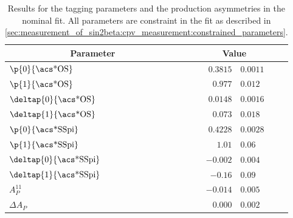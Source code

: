 \begin{table}[h]
  \caption{Results for the tagging parameters and the production asymmetries in
  the nominal fit. All parameters are constraint in the fit as described in
  \cref{sec:measurement_of_sin2beta:cpv_measurement:constrained_parameters}.}
  \label{tab:measurement_of_sin2beta:cpv_measurement:results:tagging}
  \centering
  \begin{tabular}{llr@{$\,\pm\,$}l}
      \toprule
      \multicolumn{2}{c}{Parameter}         & \multicolumn{2}{c}{Value}                 \\
      \midrule
      $\p{0}{\text{\acs*{OS}}}$        &                          & $0.3815$  & $0.0011$  \\
      $\p{1}{\text{\acs*{OS}}}$        &                          & $0.977$   & $0.012$   \\
      $\deltap{0}{\text{\acs*{OS}}}$   &                          & $0.0148$  & $0.0016$  \\
      $\deltap{1}{\text{\acs*{OS}}}$   &                          & $0.073$   & $0.018$   \\
      $\p{0}{\text{\acs*{SSpi}}}$      &                          & $0.4228$  & $0.0028$  \\
      $\p{1}{\text{\acs*{SSpi}}}$      &                          & $1.01$    & $0.06$    \\
      $\deltap{0}{\text{\acs*{SSpi}}}$ &                          & $-0.002$  & $0.004$   \\
      $\deltap{1}{\text{\acs*{SSpi}}}$ &                          & $-0.16$   & $0.09$    \\
      $A_P^{11}$                &                          & $-0.014$  & $0.005$   \\
      $\Delta A_P$              &                          & $0.000$   & $0.002$   \\
      \bottomrule
    \end{tabular}
\end{table}
%
